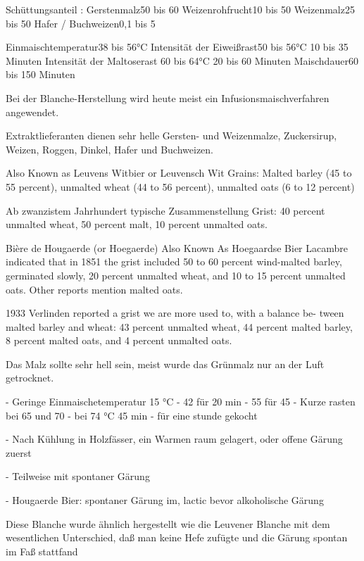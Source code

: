 \documentclass[a4paper,parskip=half]{scrartcl}
\begin{document}
\parencite[13]{Strottner1999}
Schüttungsanteil :
Gerstenmalz50 bis 60 %
Weizenrohfrucht10 bis 50 %
Weizenmalz25 bis 50 %
Hafer / Buchweizen0,1 bis 5 %

Einmaischtemperatur38 bis 56°C
Intensität der Eiweißrast50 bis 56°C
10 bis 35 Minuten
Intensität der Maltoserast
60 bis 64°C
20 bis 60 Minuten
Maischdauer60 bis 150 Minuten

\parencite[12]{Strottner1999}
Bei der Blanche-Herstellung wird heute meist ein Infusionsmaischverfahren
angewendet.

\parencite[1]{Strottner1999}
Extraktlieferanten dienen sehr helle Gersten- und Weizenmalze, Zuckersirup,
Weizen, Roggen, Dinkel, Hafer und Buchweizen.

\parencite[40]{Hieronymus2010}
Also Known as Leuvens Witbier or Leuvensch Wit
Grains: Malted barley (45 to 55 percent), unmalted wheat (44 to 56
percent), unmalted oats (6 to 12 percent)

Ab zwanzistem Jahrhundert typische Zusammenstellung
Grist: 40 percent unmalted wheat, 50 percent malt, 10 percent unmalted
oats.
\parencite[43]{Hieronymus2010}

\parencite[45]{Hieronymus2010}
Bière de Hougaerde (or Hoegaerde)
Also Known As Hoegaardse Bier
Lacambre indicated that in 1851 the grist included 50 to 60 percent
wind-malted barley, germinated slowly, 20 percent unmalted wheat, and
10 to 15 percent unmalted oats. Other reports mention malted oats.

1933 Verlinden reported a grist we are more used to, with a balance be-
tween malted barley and wheat: 43 percent unmalted wheat, 44 percent
malted barley, 8 percent malted oats, and 4 percent unmalted oats.

Das Malz sollte
sehr hell sein, meist wurde das Grünmalz nur an der Luft getrocknet.

\parencite[46]{Hieronymus2010}
- Geringe Einmaischetemperatur 15 °C
- 42 für 20 min
- 55 für 45
- Kurze rasten bei 65 und 70
- bei 74 °C 45 min
- für eine stunde gekocht

- Nach Kühlung in Holzfässer, ein Warmen raum gelagert, oder offene Gärung zuerst

- Teilweise mit spontaner Gärung

- Hougaerde Bier: spontaner Gärung im, lactic bevor alkoholische Gärung

\parencite[11]{Strottner1999}
Diese Blanche wurde ähnlich hergestellt wie die Leuvener Blanche mit dem
wesentlichen Unterschied, daß man keine Hefe zufügte und die Gärung spontan im
Faß stattfand
\end{document}
